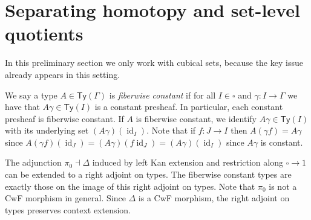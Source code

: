 \documentclass[10pt,a4paper]{article}
\newcommand\Ty{\mathsf{Ty}}
\DeclareMathOperator\id{id}
\begin{document}
\section{Separating homotopy and set-level quotients}\label{sec:cset-homotopy-quotients-vs-meta-quotients}

In this preliminary section we only work with cubical sets, because the key issue already appears in this setting.

We say a type \(A \in \Ty(\Gamma)\) is \emph{fiberwise constant} if for all \(I \in \square\) and \(\gamma \colon I \to \Gamma\) we have that \(A\gamma \in \Ty(I)\) is a constant presheaf.
In particular, each constant presheaf is fiberwise constant.
If \(A\) is fiberwise constant, we identify \(A\gamma \in \Ty(I)\) with its underlying set \((A\gamma)(\id_I)\).
Note that if \(f \colon J \to I\) then \(A(\gamma f) = A\gamma\) since \(A(\gamma f)(\id_J) = (A\gamma)(f\id_J) = (A\gamma)(\id_I)\) since \(A\gamma\) is constant.

The adjunction \(\pi_0 \dashv \Delta\) induced by left Kan extension and restriction along \(\square \to 1\) can be extended to a right adjoint on types.
The fiberwise constant types are exactly those on the image of this right adjoint on types.
Note that \(\pi_0\) is not a CwF morphism in general.
Since \(\Delta\) is a CwF morphism, the right adjoint on types preserves context extension.
\end{document}
